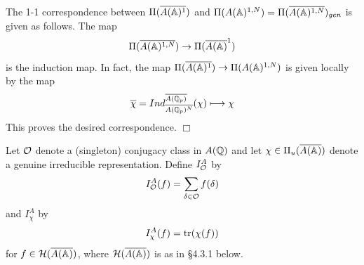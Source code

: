 The 1-1 correspondence between $\Pi (\overline{A({\Bbb{A}})^1})$ and
$\Pi (A({\Bbb{A}})^{1,N})=\Pi (\overline{A({\Bbb{A}})^{1,N}})_{gen}$
is given as follows. The map 
\[
\Pi (\overline{A({\Bbb{A}})^{1,N}})
\rightarrow \Pi (\overline{A({\Bbb{A}})}^1)
\]
is the induction map. In fact, the map
$\Pi (\overline{A({\Bbb{A}})^1})\rightarrow
\Pi (A({\Bbb{A}})^{1,N})$
is given locally by the map 
\[
\overline{\chi }
=Ind_{\overline{A({\Bbb{Q}}_p)^N}}^{\overline{A({\Bbb{Q}}_p)}}
(\chi )\longmapsto \chi 
\]
This proves the desired correspondence. $\Box $

Let ${\cal{O}}$ denote a (singleton) conjugacy
class in $A({\Bbb{Q}})$ and let
$\chi\in \Pi_u(\overline{A({\Bbb{A}})})$ denote a genuine irreducible
representation. Define $I^A_{\cal{O}}$ by
\begin{equation}
I^A_{\cal{O}}(f)=
\sum_{\delta\in {\cal{O}}}
f(\delta)
\end{equation}
and $I^A_{\chi}$ by
\begin{equation}
I^A_{\chi}(f)=
{\rm tr}(\chi(f)) 
\end{equation}
for $f\in {\cal{H}}(\overline{A({\Bbb{A}})})$, where
${\cal{H}}(\overline{A({\Bbb{A}})})$ is as in \S 4.3.1 below.



